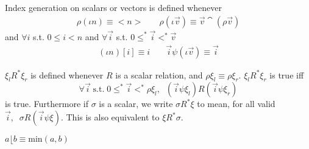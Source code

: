 \begin{definition} Index generation on scalars or vectors is defined
whenever
\begin{eqnarray*}
\rho (\iota n) \equiv <n> &\;& \rho (\iota \vec v) \equiv
\vec v \cat (\rho \vec v)
\end{eqnarray*}
and $\forall i$ s.t. $0 \leq i < n$ and
$\forall \vec i$ s.t. $0 \leq^{*} \vec i <^{*} \vec v$
\begin{eqnarray*}
(\iota n) [i] \equiv i &\;&
\vec i \psi  (\iota \vec v) \equiv \vec i
\end{eqnarray*}
\end{definition}
\begin{definition} $\xi_{l} R^{*} \xi_{r}$ is defined whenever $R$ is a scalar 
relation, and $\rho\xi_{l}\equiv\rho\xi_{r}$.  $\xi_{l} R^{*} \xi_{r}$ is
true iff $$\forall\vec{i}\;\mbox{s.t.}\; 0\leq^{*}\vec{i}<^{*}\rho\xi_{l},\;\;
(\vec{i}\psi\xi_{l}) R (\vec{i}\psi\xi_{r})$$ is true.  Furthermore if
$\sigma$ is a scalar, we write $\sigma R^{*} \xi$ to mean, for all valid
$\vec{i},\;\;\sigma R(\vec{i}\psi\xi)$.  This is also equivalent to
$\xi R^{*}\sigma$.
\end{definition}
\begin{definition}
$a\lfloor b\equiv \mbox{min}(a,b)$
\end{definition}


